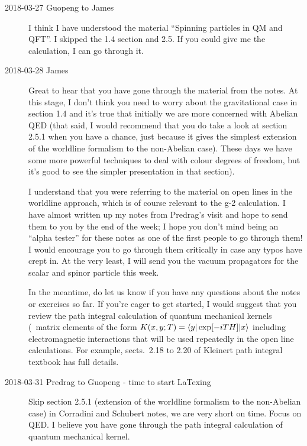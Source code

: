 \begin{description}

\item[2018-03-27 Guopeng to James]
I think I have understood the material ``Spinning particles in QM and
QFT''. I skipped the 1.4 section and 2.5. If you could give
me the calculation,  I can go through it.

\item[2018-03-28 James]
Great to hear that you have gone through the material from the notes. At this
stage, I don't think you need to worry about the gravitational case in section
1.4 and it's true that initially we are more concerned with Abelian QED (that
said, I would recommend that you do take a look at section 2.5.1 when you have
a chance, just because it gives the simplest extension of the worldline
formalism to the non-Abelian case). These days we have some more powerful
techniques to deal with colour degrees of freedom, but it's good to see the
simpler presentation in that section).

I understand that you were referring to the material on open lines in the
worldline approach, which is of course relevant to the g-2 calculation. I have
almost written up my notes from Predrag's visit and hope to send them to you by
the end of the week; I hope you don't mind being an ``alpha tester'' for these
notes as one of the first people to go through them! I would encourage you to
go through them critically in case any typos have crept in. At the very least,
I will send you the vacuum propagators for the scalar and spinor particle this
week.

In the meantime, do let us know if you have any questions about the notes or
exercises so far. If you're eager to get started, I would suggest that you
review the path integral calculation of quantum mechanical kernels (\ie\ matrix
elements of the form $K(x, y; T) = \bra{y} \exp[-i T H] \ket{x}$ including
electromagnetic interactions that will be used repeatedly in the open line
calculations. For example, sects.~2.18 to 2.20 of Kleinert path
integral textbook has full details.

\item[2018-03-31 Predrag to Guopeng - time to start LaTexing]
Skip section 2.5.1 (extension of the worldline formalism to the non-Abelian
case) in Corradini and Schubert notes, we are very short on time.
Focus on QED. I believe you have gone through the path integral calculation of
quantum mechanical kernel.


\end{description}
